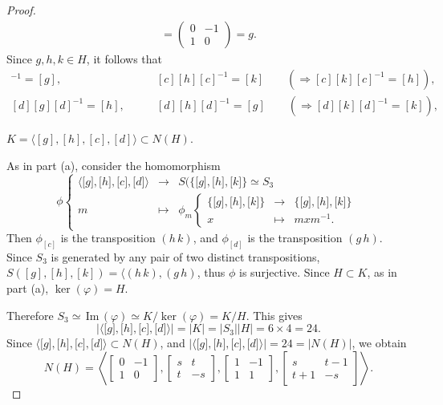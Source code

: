 \documentclass[11pt,a4paper]{article}
\newcommand{\im}{\,\mathrm{Im}\,}
\begin{document}
{\begin{proof}
\begin{align*}
=\begin{pmatrix} 0 & -1\\1 & 0 \end{pmatrix} = g.
\end{align*}
Since $g,h,k \in H$, it follows that 
\begin{align*}
[c][g][c]^{-1} = [g], \qquad &[c][h][c]^{-1} = [k]\qquad (\Rightarrow [c][k][c]^{-1} = [h]),\\
[d][g][d]^{-1} = [h],\qquad &[d][h][d]^{-1} = [g]\qquad (\Rightarrow [d][k][d]^{-1} = [k]),
\end{align*}

$K =\langle [g],[h],[c],[d]\rangle \subset N(H)$.

As in part (a), consider the homomorphism
$$
\phi
\left\{
\begin{array}{ccc}
\langle {[}g{]},{[}h{]},{[}c{]},{[}d{]} \rangle & \to & S(\{{[}g{]},{[}h{]},{[}k{]}\} \simeq S_3\\
m & \mapsto &\phi_m
    \left\{
    \begin{array}{ccc}
    \{{[}g{]},{[}h{]},{[}k{]}\} & \to & \{{[}g{]},{[}h{]},{[}k{]}\} \\
    x &\mapsto & mxm^{-1}.
    \end{array}
    \right.
\end{array}
\right.
$$
Then $\phi_{[c]}$ is the transposition $(h\,k)$, and $\phi_{[d]}$ is the transposition $(g \,h)$. Since $S_3$ is generated by any pair of two distinct transpositions, $S([g],[h],[k]) = \langle (h\,k), (g\,h)$, thus $\phi$ is surjective. Since $H \subset K$, as in part (a), $\ker(\varphi) = H$.

Therefore $S_3 \simeq \im(\varphi) \simeq K/\ker(\varphi) = K/H$. This gives
$$|\langle {[}g{]},{[}h{]},{[}c{]},{[}d{]}  \rangle | = |K| = |S_3| |H| = 6 \times 4 = 24. $$
Since $\langle {[}g{]},{[}h{]},{[}c{]},{[}d{]}  \rangle \subset N(H)$, and $|\langle {[}g{]},{[}h{]},{[}c{]},{[}d{]}  \rangle | = 24 = |N(H)|$, we obtain 
$$N(H) = \left \langle
 \begin{bmatrix} 0 & -1\\1 & 0 \end{bmatrix},\begin{bmatrix} s& t \\t & -s \end{bmatrix}, \begin{bmatrix} 1 & -1\\1 & 1 \end{bmatrix},\begin{bmatrix} s & t-1\\t+1 & -s \end{bmatrix}
 \right \rangle.
$$
\end{proof}

}
\end{document}
